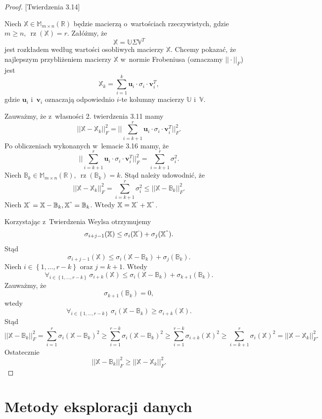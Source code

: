 \documentclass[12pt,a4paper]{report}
\newcommand{\set}[1]{\left\lbrace {#1} \right\rbrace}
\newcommand{\setR}{\mathbb{R}}
\newcommand{\rz}[1]{\operatorname{rz}\left({#1} \right)}
\begin{document}
\begin{proof}{[Twierdzenia 3.14]} 

Niech $\mathbb{X} \in \mathbb{M}_{m\times n}(\setR)$ będzie macierzą o~wartościach rzeczywistych, gdzie $m \geqslant n, \: \rz{\mathbb{X}} = r$.
Załóżmy, że
$$
\mathbb{X}=\mathbb{U} \Sigma \mathbb{V}^T
$$
jest rozkładem według wartości osobliwych macierzy $\mathbb{X}$.
Chcemy pokazać, że najlepszym przybliżeniem macierzy $\mathbb{X}$ w~normie Frobeniusa (oznaczamy $||\cdot||_F$) jest
$$
\mathbb{X}_k = \sum_{i=1}^k \mathbf{u}_i\cdot \sigma_i \cdot \mathbf{v}_i^T,
$$
gdzie $\mathbf{u}_i$ i~$\mathbf{v}_i$ oznaczają odpowiednio $i$-te kolumny macierzy $\mathbb{U}$ i~$\mathbb{V}$.

Zauważmy, że z~własności 2. twierdzenia 3.11 mamy
$$
||\mathbb{X} - \mathbb{X}_k||_F^2 = ||\sum_{i=k+1}^r \mathbf{u}_i \cdot \sigma_i \cdot \mathbf{v}_i^T||_F^2.
$$
Po obliczeniach wykonanych w~lemacie 3.16 mamy, że
$$
||\sum_{i=k+1}^r \mathbf{u}_i \cdot \sigma_i \cdot \mathbf{v}_i^T||_F^2 =\sum_{i=k+1}^r \sigma_i^2.
$$
Niech $\mathbb{B}_k \in \mathbb{M}_{m \times n}(\setR), \: \rz{\mathbb{B}_k} = k$. 
Stąd należy udowodnić, że
$$
||\mathbb{X} - \mathbb{X}_k||_F^2 = \sum_{i=k+1}^r \sigma_i^2 \leqslant ||\mathbb{X} - \mathbb{B}_k||_F^2.
$$
Niech $\mathbb{X}^{`} = \mathbb{X}-\mathbb{B}_k, \mathbb{X}^{``} = \mathbb{B}_k$.
Wtedy $\mathbb{X} = \mathbb{X}^{`} + \mathbb{X}^{``}$. 

Korzystając z~Twierdzenia Weylsa otrzymujemy
$$
\sigma_{i+j-1}(\mathbb{X})\leq \sigma_{i}(\mathbb{X}^{`}) + \sigma_j(\mathbb{X}^{``}).
$$ 
Stąd
$$
\sigma_{i+j-1}(\mathbb{X})\leq \sigma_{i}(\mathbb{X} - \mathbb{B}_k) + \sigma_j(\mathbb{B}_k).
$$ 
Niech $i \in \set{1, \ldots, r-k}$ oraz $j= k+1$. Wtedy
$$
\forall_{i \in \set{1, \ldots, r-k}} \: \sigma_{i+k}(\mathbb{X})\leq \sigma_{i}(\mathbb{X} - \mathbb{B}_k) + \sigma_{k+1}(\mathbb{B}_k).
$$ 
Zauważmy, że
$$
\sigma_{k+1}(\mathbb{B}_k)=0,
$$
wtedy
$$
\forall_{i \in \set{1, \ldots, r-k}} \: \sigma_i(\mathbb{X}-\mathbb{B}_k)\geq \sigma_{i+k}(\mathbb{X}).
$$
Stąd
$$
||\mathbb{X} - \mathbb{B}_k||_F^2 = \sum_{i=1}^r \sigma_i(\mathbb{X}-\mathbb{B}_k)^2 \geq \sum_{i=1}^{r-k} \sigma_i(\mathbb{X}-\mathbb{B}_k)^2 \geq \sum_{i=1}^{r-k} \sigma_{i+k}(\mathbb{X})^2 \geq \sum_{i = k+1}^r \sigma_i(\mathbb{X})^2 = ||\mathbb{X}-\mathbb{X}_k||_F^2 .
$$
Ostatecznie
$$
||\mathbb{X} - \mathbb{B}_k||_F^2 \geqslant ||\mathbb{X}-\mathbb{X}_k||_F^2.
$$
\end{proof}


\section{Metody eksploracji danych}
\end{document}

